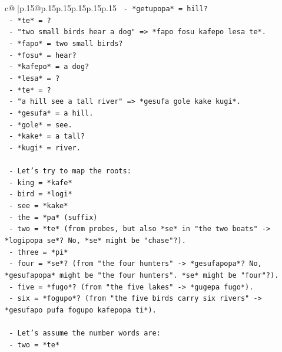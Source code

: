 \documentclass{article}
\begin{document}
{\begin{supertabular}{c@{$\;$}|p{.15\linewidth}@{}p{.15\linewidth}p{.15\linewidth}p{.15\linewidth}p{.15\linewidth}p{.15\linewidth}}
{{{\texttt{              {-} *getupopa* = hill?} \\
\texttt{              {-} *te* = ?} \\
\texttt{            {-} "two small birds hear a dog" => *fapo fosu kafepo lesa te*.} \\
\texttt{              {-} *fapo* = two small birds?} \\
\texttt{              {-} *fosu* = hear?} \\
\texttt{              {-} *kafepo* = a dog?} \\
\texttt{              {-} *lesa* = ?} \\
\texttt{              {-} *te* = ?} \\
\texttt{            {-} "a hill see a tall river" => *gesufa gole kake kugi*.} \\
\texttt{              {-} *gesufa* = a hill.} \\
\texttt{              {-} *gole* = see.} \\
\texttt{              {-} *kake* = a tall?} \\
\texttt{              {-} *kugi* = river.} \\
\\ 
\texttt{            {-} Let's try to map the roots:} \\
\texttt{              {-} king = *kafe*} \\
\texttt{              {-} bird = *logi*} \\
\texttt{              {-} see = *kake*} \\
\texttt{              {-} the = *pa* (suffix)} \\
\texttt{              {-} two = *te* (from probes, but also *se* in "the two boats" {-}> *logipopa se*? No, *se* might be "chase"?).} \\
\texttt{              {-} three = *pi*} \\
\texttt{              {-} four = *se*? (from "the four hunters" {-}> *gesufapopa*? No, *gesufapopa* might be "the four hunters". *se* might be "four"?).} \\
\texttt{              {-} five = *fugo*? (from "the five lakes" {-}> *gugepa fugo*).} \\
\texttt{              {-} six = *fogupo*? (from "the five birds carry six rivers" {-}> *gesufapo pufa fogupo kafepopa ti*).} \\
\\ 
\texttt{            {-} Let's assume the number words are:} \\
\texttt{              {-} two = *te*} \\
}}}
\end{supertabular}}
\end{document}
